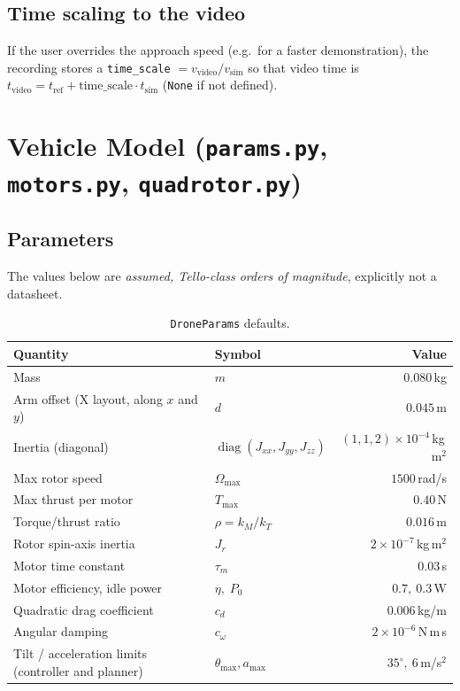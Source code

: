 \documentclass[11pt,a4paper]{article}
\newcommand{\code}[1]{\texttt{\small #1}}
\DeclareMathOperator{\diag}{diag}
\begin{document}
\subsection{Time scaling to the video}
If the user overrides the approach speed (e.g.\ for a faster demonstration), the recording stores a \code{time\_scale} $=v_{\text{video}}/v_{\text{sim}}$ so that video time is
$t_{\text{video}}=t_{\text{ref}}+\text{time\_scale}\cdot t_{\text{sim}}$ (\code{None} if not defined).

\section{Vehicle Model (\code{params.py}, \code{motors.py}, \code{quadrotor.py})}
\subsection{Parameters}
The values below are \emph{assumed, Tello-class orders of magnitude}, explicitly not a datasheet.

\begin{table}[h]
\centering\small
\begin{tabular}{@{}llr@{}}
\toprule
Quantity & Symbol & Value \\ \midrule
Mass & $m$ & $0.080$\,kg \\
Arm offset (X layout, along $x$ and $y$) & $d$ & $0.045$\,m \\
Inertia (diagonal) & $\diag(J_{xx},J_{yy},J_{zz})$ & $(1,1,2)\times10^{-4}$\,kg\,m$^2$ \\
Max rotor speed & $\Omega_{\max}$ & $1500$\,rad/s \\
Max thrust per motor & $T_{\max}$ & $0.40$\,N \\
Torque/thrust ratio & $\rho=k_M/k_T$ & $0.016$\,m \\
Rotor spin-axis inertia & $J_r$ & $2\times10^{-7}$\,kg\,m$^2$ \\
Motor time constant & $\tau_m$ & $0.03$\,s \\
Motor efficiency, idle power & $\eta,\;P_0$ & $0.7,\ 0.3$\,W \\
Quadratic drag coefficient & $c_d$ & $0.006$\,kg/m \\
Angular damping & $c_\omega$ & $2\times10^{-6}$\,N\,m\,s \\
Tilt / acceleration limits (controller and planner) & $\theta_{\max},a_{\max}$ & $35^\circ,\ 6$\,m/s$^2$ \\
\bottomrule
\end{tabular}
\caption{\code{DroneParams} defaults.}
\end{table}
\end{document}
